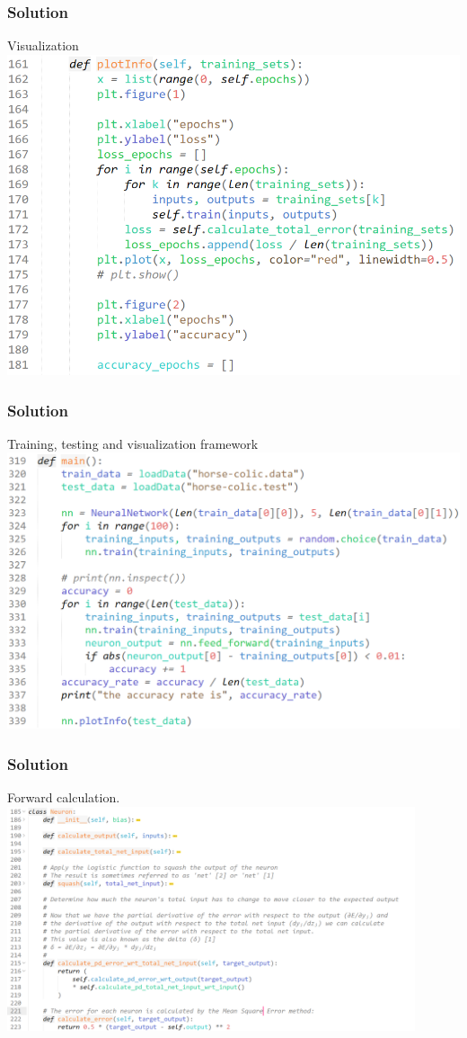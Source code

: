 \documentclass{beamer}
\begin{document}
\begin{frame}
  \frametitle{Solution}
	   Visualization
      \\[10pt]
      \includegraphics[width=1.0\textwidth]{Pic/visualization.png}

\end{frame}

\begin{frame}
  \frametitle{Solution}
	   Training, testing and visualization framework
      \\[10pt]
      \includegraphics[width=1.0\textwidth]{Pic/framwork.png}

\end{frame}

\begin{frame}
  \frametitle{Solution}
	  Forward calculation.
      \\[10pt]
      \includegraphics[width=0.9\textwidth]{Pic/forward.png}

\end{frame}
\end{document}
